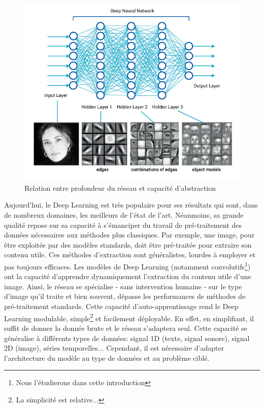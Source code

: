 \begin{figure}
    \centering
    \includegraphics[scale=0.45]{./tex/fondamentaux/dlabs.jpg}
    \caption{Relation entre profondeur du réseau et capacité d'abstraction}
    \label{absdl}
\end{figure}

\noindent Aujourd'hui, le Deep Learning est très populaire pour ses résultats qui sont, dans de nombreux domaines, les meilleurs de l'état de l'art. Néanmoins, sa grande qualité repose sur sa capacité à s'émanciper du travail de pré-traitement des données nécessaires aux méthodes plus classiques. Par exemple, une image, pour être exploitée par des modèles standards, doit être pré-traitée pour extraire son contenu utile. Ces méthodes d'extraction sont généralistes, lourdes à employer et pas toujours efficaces. Les modèles de Deep Learning (notamment convolutifs\footnote{Nous l'étudierons dans cette introduction}) ont la capacité d'apprendre dynamiquement l'extraction du contenu utile d'une image. Ainsi, le réseau se spécialise - sans intervention humaine - sur le type d'image qu'il traite et bien souvent, dépasse les performances de méthodes de pré-traitement standards. Cette capacité d'auto-apprentissage rend le Deep Learning modulable, simple\footnote{La simplicité est relative...} et facilement déployable. En effet, en simplifiant, il suffit de donner la donnée brute et le réseau s'adaptera seul. Cette capacité se généralise à différents types de données: signal 1D (texte, signal sonore), signal 2D (image), séries temporelles... Cependant, il est nécessaire d'adapter l'architecture du modèle au type de données et au problème ciblé.\\

